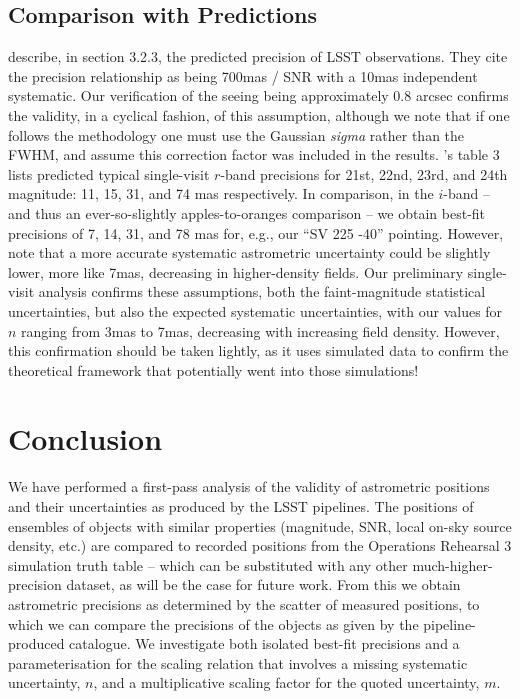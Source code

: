 \documentclass[SE,lsstdraft,authoryear,toc]{lsstdoc}
\begin{document}
\subsection{Comparison with \citet{Ivezic2019} Predictions}
\citet{Ivezic2019} describe, in section 3.2.3, the predicted precision of LSST observations.
They cite the precision relationship as being 700mas / SNR with a 10mas independent systematic.
Our verification of the seeing being approximately 0.8 arcsec confirms the validity, in a cyclical fashion, of this assumption, although we note that if one follows the \citet{King:1983aa} methodology one must use the Gaussian \textit{sigma} rather than the FWHM, and assume this correction factor was included in the \citeauthor{Ivezic2019} results.
\citeauthor{Ivezic2019}'s table 3 lists predicted typical single-visit $r$-band precisions for 21st, 22nd, 23rd, and 24th magnitude: 11, 15, 31, and 74 mas respectively.
In comparison, in the $i$-band -- and thus an ever-so-slightly apples-to-oranges comparison -- we obtain best-fit precisions of 7, 14, 31, and 78 mas for, e.g., our ``SV 225 -40'' pointing.
However, \citet{Ivezic2019} note that a more accurate systematic astrometric uncertainty could be slightly lower, more like 7mas, decreasing in higher-density fields.
Our preliminary single-visit analysis confirms these assumptions, both the faint-magnitude statistical uncertainties, but also the expected systematic uncertainties, with our values for $n$ ranging from 3mas to 7mas, decreasing with increasing field density.
However, this confirmation should be taken lightly, as it uses simulated data to confirm the theoretical framework that potentially went into those simulations!

\section{Conclusion}
We have performed a first-pass analysis of the validity of astrometric positions and their uncertainties as produced by the LSST pipelines.
The positions of ensembles of objects with similar properties (magnitude, SNR, local on-sky source density, etc.) are compared to recorded positions from the Operations Rehearsal 3 simulation truth table -- which can be substituted with any other much-higher-precision dataset, as will be the case for future work.
From this we obtain astrometric precisions as determined by the scatter of measured positions, to which we can compare the precisions of the objects as given by the pipeline-produced catalogue.
We investigate both isolated best-fit precisions and a parameterisation for the scaling relation that involves a missing systematic uncertainty, $n$, and a multiplicative scaling factor for the quoted uncertainty, $m$.
\end{document}

